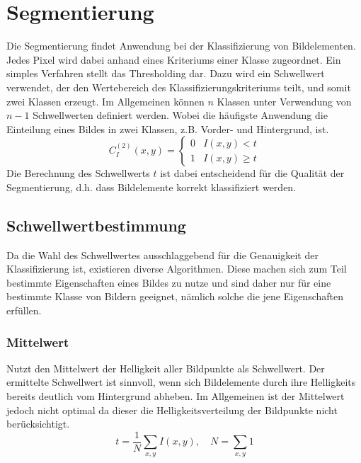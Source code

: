 \section{Segmentierung}
\writtenby{\dcauthornameewie}%
Die Segmentierung findet Anwendung bei der Klassifizierung von Bildelementen.
Jedes Pixel wird dabei anhand eines Kriteriums einer Klasse zugeordnet.
Ein simples Verfahren stellt das Thresholding dar.
Dazu wird ein Schwellwert verwendet, der den Wertebereich des Klassifizierungskriteriums teilt, und somit zwei Klassen erzeugt.
Im Allgemeinen können $n$ Klassen unter Verwendung von $n-1$ Schwellwerten definiert werden.
%
%
Wobei die häufigste Anwendung die Einteilung eines Bildes in zwei Klassen, z.B. Vorder- und Hintergrund, ist.
%
  \[ C_I^{(2)}(x,y) = \begin{cases}
       0 & I(x,y) <    t \\
       1 & I(x,y) \geq t
     \end{cases} \]
%
Die Berechnung des Schwellwerts $t$ ist dabei entscheidend für die Qualität der Segmentierung, d.h. dass Bildelemente korrekt klassifiziert werden.

\subsection*{Schwellwertbestimmung}
Da die Wahl des Schwellwertes ausschlaggebend für die Genauigkeit der Klassifizierung ist, existieren diverse Algorithmen.
Diese machen sich zum Teil bestimmte Eigenschaften eines Bildes zu nutze und sind daher nur für eine bestimmte Klasse von Bildern geeignet, nämlich solche die jene Eigenschaften erfüllen.

\subsubsection*{Mittelwert}
Nutzt den Mittelwert der Helligkeit aller Bildpunkte als Schwellwert.
Der ermittelte Schwellwert ist sinnvoll, wenn sich Bildelemente durch ihre Helligkeits bereits deutlich vom Hintergrund abheben.
Im Allgemeinen ist der Mittelwert jedoch nicht optimal da dieser die Helligkeitsverteilung der Bildpunkte nicht berücksichtigt.
  \[ t = \frac{1}{N} \sum_{x,y} I(x,y), \quad N = \sum_{x,y} 1 \]

